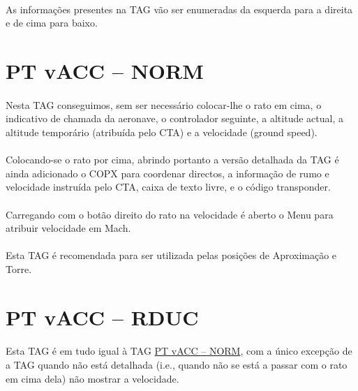 \documentclass[10pt]{report}
\begin{document}
\paragraph{} As informações presentes na TAG vão ser enumeradas da esquerda para a direita e de
cima para baixo.

\section{PT vACC – NORM}
\label{sec:tag-norm}
\paragraph{} Nesta TAG conseguimos, sem ser necessário colocar-lhe o rato em cima, o indicativo de
chamada da aeronave, o controlador seguinte, a altitude actual, a altitude temporário (atribuída
pelo CTA) e a velocidade (ground speed).

\paragraph{} Colocando-se o rato por cima, abrindo portanto a versão detalhada da TAG é ainda
adicionado o COPX para coordenar directos, a informação de rumo e velocidade instruída pelo CTA,
caixa de texto livre, e o código transponder.

\paragraph{}
Carregando com o botão direito do rato na velocidade é aberto o Menu para atribuir velocidade em
Mach.

\paragraph{} Esta TAG é recomendada para ser utilizada pelas posições de Aproximação e Torre.

\section{PT vACC – RDUC}
\paragraph{} Esta TAG é em tudo igual à TAG \hyperref[sec:tag-norm]{PT vACC – NORM}, com a único
excepção de a TAG quando não está detalhada (i.e., quando não se está a passar com o rato em cima
dela) não mostrar a velocidade.
\end{document}
